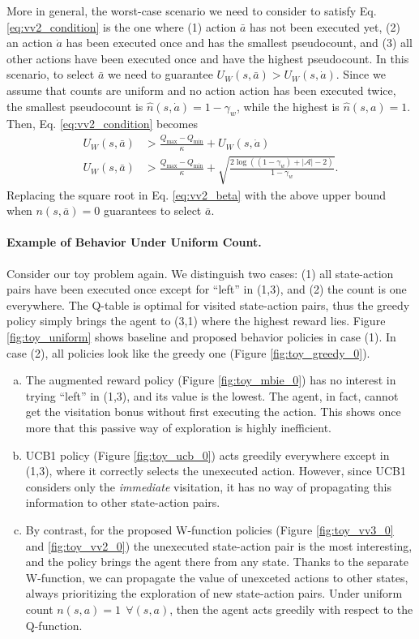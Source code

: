 \documentclass{article}
\newcommand{\actionspace}{\mathcal A}
\newcommand{\coeff}{\kappa}
\begin{document}
\clearpage

More in general, the worst-case scenario we need to consider to satisfy Eq. \eqref{eq:vv2_condition} is the one where (1) action $\bar{a}$ has not been executed yet, (2) an action $\dot{a}$ has been executed once and has the smallest pseudocount, and (3) all other actions have been executed once and have the highest pseudocount. In this scenario, to select $\bar{a}$ we need to guarantee $U_W(s,\bar{a}) > U_W(s,\dot{a})$. Since we assume that counts are uniform and no action action has been executed twice, the smallest pseudocount is $\hat n(s,\dot{a}) = 1 - \gamma_w$, while the highest is $\hat n(s,a) = 1$. Then, Eq. \eqref{eq:vv2_condition} becomes
\begin{align}
U_W(s,\bar{a}) &> \frac{Q_{\max} - Q_{\min}}{\coeff} + U_W(s,\dot{a}) \nonumber
\\
U_W(s,\bar{a}) &> \frac{Q_{\max} - Q_{\min}}{\coeff} + \sqrt{\frac{2\log\left((1 - \gamma_w) + |\actionspace| - 2\right)}{1 - \gamma_w}}. \label{eq:vv2_condition2}
\end{align}
Replacing the square root in Eq. \eqref{eq:vv2_beta} with the above upper bound when $n(s,\bar{a}) = 0$ guarantees to select $\bar{a}$. 


\paragraph{Example of Behavior Under Uniform Count.}
Consider our toy problem again. We distinguish two cases: (1) all state-action pairs have been executed once except for ``left'' in (1,3), and (2) the count is one everywhere. 
The Q-table is optimal for visited state-action pairs, thus the greedy policy simply brings the agent to (3,1) where the highest reward lies. 
Figure \ref{fig:toy_uniform} shows baseline and proposed behavior policies in case (1). In case (2), all policies look like the greedy one (Figure \ref{fig:toy_greedy_0}).
\begin{enumerate}[a)]
\setlength{\itemsep}{0pt}
\item The augmented reward policy (Figure \ref{fig:toy_mbie_0}) has no interest in trying ``left'' in (1,3), and its value is the lowest. The agent, in fact, cannot get the visitation bonus without first executing the action. This shows once more that this passive way of exploration is highly inefficient.
\item UCB1 policy (Figure \ref{fig:toy_ucb_0}) acts greedily everywhere except in (1,3), where it correctly selects the unexecuted action. However, since UCB1 considers only the \textit{immediate} visitation, it has no way of propagating this information to other state-action pairs.
\item By contrast, for the proposed W-function policies (Figure \ref{fig:toy_vv3_0} and \ref{fig:toy_vv2_0}) the unexecuted state-action pair is the most interesting, and the policy brings the agent there from any state. Thanks to the separate W-function, we can propagate the value of unexceted actions to other states, always prioritizing the exploration of new state-action pairs. Under uniform count $n(s,a) = 1 \:\: \forall (s,a)$, then the agent acts greedily with respect to the Q-function.
\end{enumerate}
\end{document}
